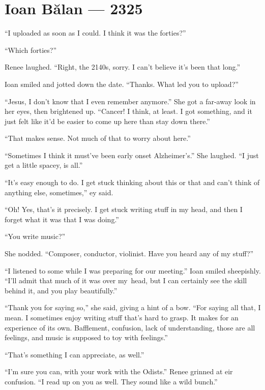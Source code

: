 \hypertarget{ioan-bux103lan-2325}{%
\chapter{Ioan Bălan — 2325}\label{ioan-bux103lan-2325}}

``I uploaded as soon as I could. I think it was the forties?''

``Which forties?''

Renee laughed. ``Right, the 2140s, sorry. I can't believe it's been that long.''

Ioan smiled and jotted down the date. ``Thanks. What led you to upload?''

``Jesus, I don't know that I even remember anymore.'' She got a far-away look in her eyes, then brightened up. ``Cancer! I think, at least. I got something, and it just felt like it'd be easier to come up here than stay down there.''

``That makes sense. Not much of that to worry about here.''

``Sometimes I think it must've been early onset Alzheimer's.'' She laughed. ``I just get a little spacey, is all.''

``It's easy enough to do. I get stuck thinking about this or that and can't think of anything else, sometimes,'' ey said.

``Oh! Yes, that's it precisely. I get stuck writing stuff in my head, and then I forget what it was that I was doing.''

``You write music?''

She nodded. ``Composer, conductor, violinist. Have you heard any of my stuff?''

``I listened to some while I was preparing for our meeting.'' Ioan smiled sheepishly. ``I'll admit that much of it was over my\pagebreak\ head, but I can certainly see the skill behind it, and you play beautifully.''

``Thank you for saying so,'' she said, giving a hint of a bow. ``For saying all that, I mean. I sometimes enjoy writing stuff that's hard to grasp. It makes for an experience of its own. Bafflement, confusion, lack of understanding, those are all feelings, and music is supposed to toy with feelings.''

``That's something I can appreciate, as well.''

``I'm sure you can, with your work with the Odists.'' Renee grinned at eir confusion. ``I read up on you as well. They sound like a wild bunch.''

